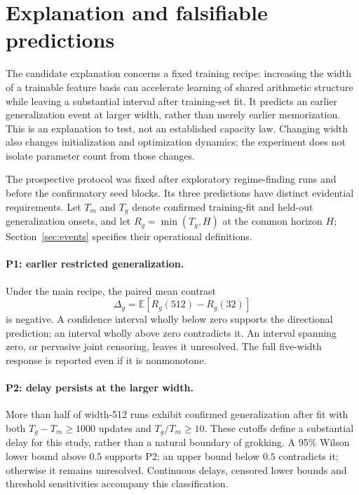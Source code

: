 \section{Explanation and falsifiable predictions}
\label{sec:hypotheses}
The candidate explanation concerns a fixed training recipe: increasing the width of a trainable feature basis can accelerate learning of shared arithmetic structure while leaving a substantial interval after training-set fit. It predicts an earlier generalization event at larger width, rather than merely earlier memorization. This is an explanation to test, not an established capacity law. Changing width also changes initialization and optimization dynamics; the experiment does not isolate parameter count from those changes.

The prospective protocol was fixed after exploratory regime-finding runs and before the confirmatory seed blocks. Its three predictions have distinct evidential requirements. Let $T_m$ and $T_g$ denote confirmed training-fit and held-out generalization onsets, and let $R_g=\min(T_g,H)$ at the common horizon $H$; Section~\ref{sec:events} specifies their operational definitions.

\paragraph{P1: earlier restricted generalization.}
Under the main recipe, the paired mean contrast
\begin{equation}
\Delta_g=\mathbb{E}[R_g(512)-R_g(32)]
\label{eq:primary}
\end{equation}
is negative. A confidence interval wholly below zero supports the directional prediction; an interval wholly above zero contradicts it. An interval spanning zero, or pervasive joint censoring, leaves it unresolved. The full five-width response is reported even if it is nonmonotone.

\paragraph{P2: delay persists at the larger width.}
More than half of width-512 runs exhibit confirmed generalization after fit with both $T_g-T_m\geq1000$ updates and $T_g/T_m\geq10$. These cutoffs define a substantial delay for this study, rather than a natural boundary of grokking. A 95\% Wilson lower bound above $0.5$ supports P2; an upper bound below $0.5$ contradicts it; otherwise it remains unresolved. Continuous delays, censored lower bounds and threshold sensitivities accompany this classification.

